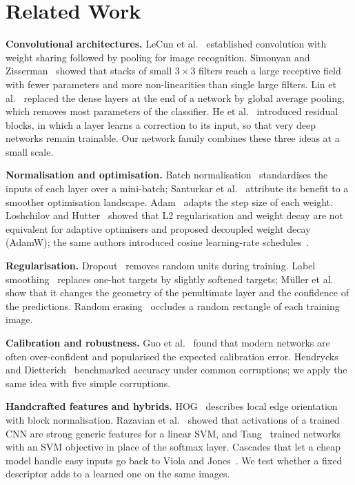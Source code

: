 \section{Related Work}
\label{sec:p2related}
\textbf{Convolutional architectures.} LeCun et al.~\cite{lecun1998gradient} established convolution with weight
sharing followed by pooling for image recognition. Simonyan and Zisserman~\cite{simonyan2015very} showed that
stacks of small $3\times3$ filters reach a large receptive field with fewer parameters and more non-linearities
than single large filters. Lin et al.~\cite{lin2014network} replaced the dense layers at the end of a network by
global average pooling, which removes most parameters of the classifier. He et al.~\cite{he2016deep} introduced
residual blocks, in which a layer learns a correction to its input, so that very deep networks remain trainable.
Our network family combines these three ideas at a small scale.

\textbf{Normalisation and optimisation.} Batch normalisation~\cite{ioffe2015batch} standardises the inputs of each
layer over a mini-batch; Santurkar et al.~\cite{santurkar2018does} attribute its benefit to a smoother optimisation
landscape. Adam~\cite{kingma2015adam} adapts the step size of each weight. Loshchilov and
Hutter~\cite{loshchilov2019decoupled} showed that L2 regularisation and weight decay are not equivalent for
adaptive optimisers and proposed decoupled weight decay (AdamW); the same authors introduced cosine learning-rate
schedules~\cite{loshchilov2017sgdr}.

\textbf{Regularisation.} Dropout~\cite{srivastava2014dropout} removes random units during training. Label
smoothing~\cite{szegedy2016rethinking} replaces one-hot targets by slightly softened targets; M\"uller et
al.~\cite{muller2019when} show that it changes the geometry of the penultimate layer and the confidence of the
predictions. Random erasing~\cite{zhong2020random} occludes a random rectangle of each training image.

\textbf{Calibration and robustness.} Guo et al.~\cite{guo2017calibration} found that modern networks are often
over-confident and popularised the expected calibration error. Hendrycks and
Dietterich~\cite{hendrycks2019benchmarking} benchmarked accuracy under common corruptions; we apply the same idea
with five simple corruptions.

\textbf{Handcrafted features and hybrids.} HOG~\cite{dalal2005histograms} describes local edge orientation with
block normalisation. Razavian et al.~\cite{razavian2014cnn} showed that activations of a trained CNN are strong
generic features for a linear SVM, and Tang~\cite{tang2013deep} trained networks with an SVM objective in place of
the softmax layer. Cascades that let a cheap model handle easy inputs go back to Viola and
Jones~\cite{viola2001rapid}. We test whether a fixed descriptor adds to a learned one on the same images.

